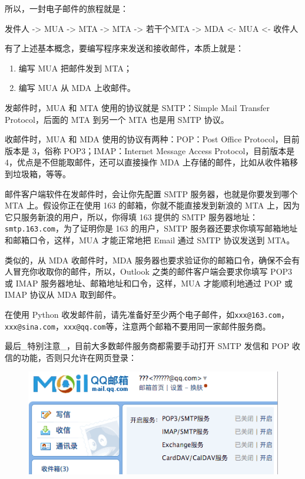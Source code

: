 所以，一封电子邮件的旅程就是：

\begin{pythoncode}
发件人 -> MUA -> MTA -> MTA -> 若干个MTA -> MDA <- MUA <- 收件人
\end{pythoncode}

有了上述基本概念，要编写程序来发送和接收邮件，本质上就是：

\begin{enumerate}
\def\labelenumi{\arabic{enumi}.}
\item
  编写 MUA 把邮件发到 MTA；
\item
  编写 MUA 从 MDA 上收邮件。
\end{enumerate}

发邮件时，MUA 和 MTA 使用的协议就是 SMTP：Simple Mail Transfer
Protocol，后面的 MTA 到另一个 MTA 也是用 SMTP 协议。

收邮件时，MUA 和 MDA 使用的协议有两种：POP：Post Office
Protocol，目前版本是 3，俗称 POP3；IMAP：Internet Message Access
Protocol，目前版本是 4，优点是不但能取邮件，还可以直接操作 MDA
上存储的邮件，比如从收件箱移到垃圾箱，等等。

邮件客户端软件在发邮件时，会让你先配置 SMTP 服务器，也就是你要发到哪个
MTA 上。假设你正在使用 163 的邮箱，你就不能直接发到新浪的 MTA
上，因为它只服务新浪的用户，所以，你得填 163 提供的 SMTP
服务器地址：\texttt{smtp.163.com}，为了证明你是 163 的用户，SMTP
服务器还要求你填写邮箱地址和邮箱口令，这样，MUA 才能正常地把 Email 通过
SMTP 协议发送到 MTA。

类似的，从 MDA 收邮件时，MDA
服务器也要求验证你的邮箱口令，确保不会有人冒充你收取你的邮件，所以，Outlook
之类的邮件客户端会要求你填写 POP3 或 IMAP
服务器地址、邮箱地址和口令，这样，MUA 才能顺利地通过 POP 或 IMAP 协议从
MDA 取到邮件。

在使用 Python
收发邮件前，请先准备好至少两个电子邮件，如\texttt{xxx@163.com}，\texttt{xxx@sina.com}，\texttt{xxx@qq.com}等，注意两个邮箱不要用同一家邮件服务商。

最后\_特别注意\_，目前大多数邮件服务商都需要手动打开 SMTP 发信和 POP
收信的功能，否则只允许在网页登录：

 
 \begin{figure}[htp]
	\centering
	\includegraphics[width=0.6\linewidth]{fig/1050933742009056l.png}
\end{figure}


